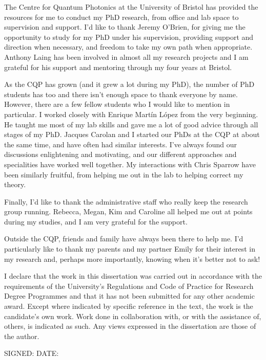 \begin{acknowledgements}
The Centre for Quantum Photonics at the University of Bristol has provided the
resources for me to conduct my PhD research, from office and lab space to
supervision and support. I'd like to thank Jeremy O'Brien, for giving me the
opportunity to study for my PhD under his supervision, providing support and
direction when necessary, and freedom to take my own path when appropriate.
Anthony Laing has been involved in almost all my research projects and I am
grateful for his support and mentoring through my four years at Bristol.

As the CQP has grown (and it grew a lot during my PhD), the number of PhD
students has too and there isn't enough space to thank everyone by name.
However, there are a few fellow students who I would like to mention in
particular. I worked closely with Enrique Mart\'in L\'opez from the very
beginning. He taught me most of my lab skills and gave me a lot of good advice
through all stages of my PhD. Jacques Carolan and I started our PhDs at the CQP
at about the same time, and have often had similar interests. I've always found
our discussions enlightening and motivating, and our different approaches and
specialities have worked well together. My interactions with Chris Sparrow have
been similarly fruitful, from helping me out in the lab to helping correct my
theory.

Finally, I'd like to thank the administrative staff who really keep the
research group running. Rebecca, Megan, Kim and Caroline all helped me out at
points during my studies, and I am very grateful for the support.

Outside the CQP, friends and family have always been there to help me. I'd
particularly like to thank my parents and my partner Emily for their
interest in my research and, perhaps more importantly, knowing when it's better
not to ask!
\end{acknowledgements}

\begin{declaration}
  I declare that the work in this dissertation was carried out in accordance
  with the requirements of the University's Regulations and Code of Practice for
  Research Degree Programmes and that it has not been submitted for any other
  academic award. Except where indicated by specific reference in the text, the
  work is the candidate's own work. Work done in collaboration with, or with the
  assistance of, others, is indicated as such. Any views expressed in the
  dissertation are those of the author.

  SIGNED: \dotfill DATE: \dotfill
\end{declaration}

\tableofcontents
\listoffigures

